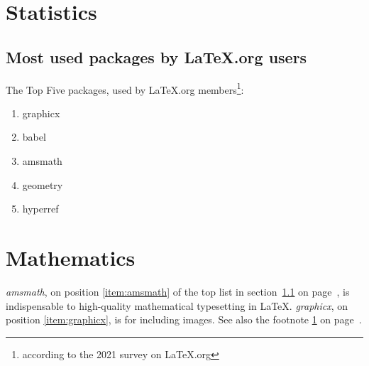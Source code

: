 \documentclass{book}
\begin{document}
\chapter{Statistics}
\section{Most used packages by LaTeX.org users}
\label{sec:packages}
The Top Five packages, used by LaTeX.org
members\footnote{according to the 2021 survey on
LaTeX.org\label{fn:project}}:
\begin{enumerate}
  \item graphicx\label{item:graphicx}
  \item babel
  \item amsmath\label{item:amsmath}
  \item geometry
  \item hyperref
\end{enumerate}
\chapter{Mathematics}
\emph{amsmath}, on position \ref{item:amsmath} of the top list
in section~\ref{sec:packages} on page~\pageref{sec:packages},
is indispensable to high-quality mathematical typesetting in
\LaTeX. \emph{graphicx}, on position \ref{item:graphicx},
is for including images. See also the footnote \ref{fn:project}
on page~\pageref{fn:project}.
\end{document}
